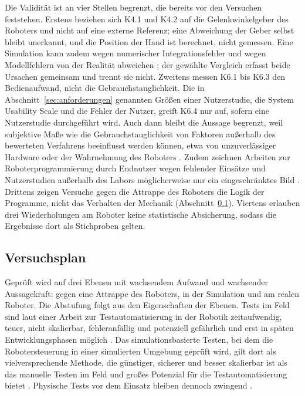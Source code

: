 Die Validität ist an vier Stellen begrenzt, die bereits vor den Versuchen feststehen.
Erstens beziehen sich K4.1 und K4.2 auf die Gelenkwinkelgeber des Roboters und nicht auf eine externe Referenz; eine Abweichung der Geber selbst bleibt unerkannt, und die Position der Hand ist berechnet, nicht gemessen.
Eine Simulation kann zudem wegen numerischer Integrationsfehler und wegen Modellfehlern von der Realität abweichen \cite{Erez2015}; der gewählte Vergleich erfasst beide Ursachen gemeinsam und trennt sie nicht.
Zweitens messen K6.1 bis K6.3 den Bedienaufwand, nicht die Gebrauchstauglichkeit.
Die in Abschnitt~\ref{sec:anforderungen} genannten Größen einer Nutzerstudie, die System Usability Scale und die Fehler der Nutzer, greift K6.4 nur auf, sofern eine Nutzerstudie durchgeführt wird.
Auch dann bleibt die Aussage begrenzt, weil subjektive Maße wie die Gebrauchstauglichkeit von Faktoren außerhalb des bewerteten Verfahrens beeinflusst werden können, etwa von unzuverlässiger Hardware oder der Wahrnehmung des Roboters \cite{Ajaykumar2021}.
Zudem zeichnen Arbeiten zur Roboterprogrammierung durch Endnutzer wegen fehlender Einsätze und Nutzerstudien außerhalb des Labors möglicherweise nur ein eingeschränktes Bild \cite{Ajaykumar2021}.
Drittens zeigen Versuche gegen die Attrappe des Roboters die Logik der Programme, nicht das Verhalten der Mechanik (Abschnitt~\ref{sec:versuchsplan}).
Viertens erlauben drei Wiederholungen am Roboter keine statistische Absicherung, sodass die Ergebnisse dort als Stichproben gelten.

\subsection{Versuchsplan}
\label{sec:versuchsplan}
Geprüft wird auf drei Ebenen mit wachsendem Aufwand und wachsender Aussagekraft: gegen eine Attrappe des Roboters, in der Simulation und am realen Roboter.
Die Abstufung folgt aus den Eigenschaften der Ebenen.
Tests im Feld sind laut einer Arbeit zur Testautomatisierung in der Robotik zeitaufwendig, teuer, nicht skalierbar, fehleranfällig und potenziell gefährlich und erst in späten Entwicklungsphasen möglich \cite{Afzal2021}.
Das simulationsbasierte Testen, bei dem die Robotersteuerung in einer simulierten Umgebung geprüft wird, gilt dort als vielversprechende Methode, die günstiger, sicherer und besser skalierbar ist als das manuelle Testen im Feld und großes Potenzial für die Testautomatisierung bietet \cite{Afzal2021}.
Physische Tests vor dem Einsatz bleiben dennoch zwingend \cite{Choi2021}.

